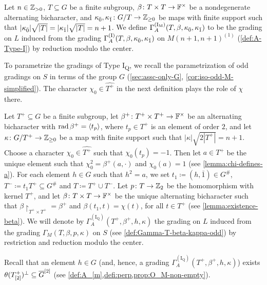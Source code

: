 \begin{defi}\label{def:Type-I_M}
    Let $n\in \mathbb{Z}_{> 0}$, $T \subseteq G$ be a finite subgroup, $\beta\colon T\times T \to \mathbb{F}^\times$ be a nondegenerate alternating bicharacter, and $\kappa_{\bar{0}}, \kappa_{\bar{1}} \colon G/T \to \mathbb{Z}_{\geq 0}$ be maps with finite support such that $|\kappa_{\bar{0}}| \sqrt{|T|} = |\kappa_{\bar{1}}| \sqrt{|T|} = n+1$. 
    We define $\Gamma^{\mathrm{(I_M)}}_A(T, \beta, \kappa_{\bar{0}}, \kappa_{\bar{1}})$ to be the grading on $L$ induced from the grading $\Gamma^{\mathrm{(I)}}_A(T, \beta, \kappa_{\bar{0}}, \kappa_{\bar{1}})$ on $M(n+1, n+1)^{(1)}$ (\cref{def:A-Type-I}) by reduction modulo the center.
\end{defi}

To parametrize the gradings of Type I\textsubscript{Q}, we recall the parametrization of odd gradings on $S$ in terms of the group $G$ (\cref{sec:assc-only-G}, \cref{cor:iso-odd-M-simplified}). 
The character $\chi_0 \in \widehat{T^+}$ in the next definition plays the role of $\chi$ there. 

\begin{defi}\label{def:Type-I_Q}
    Let $T^+ \subseteq G$ be a finite subgroup, let $\beta^+\colon T^+ \times T^+ \to \mathbb{F}^\times$ be an alternating bicharacter with $\operatorname{rad} \beta^+ = \langle t_p \rangle$, where $t_p\in T^+$ is an element of order $2$, and let $\kappa \colon G/T^+ \to \mathbb{Z}_{\geq 0}$ be a map with finite support such that $|\kappa| \sqrt{2|T^+|} = n+1$. 
    Choose a character $\chi_0 \in \widehat{T^+}$ such that $\chi_0 (t_p) = -1$. 
    Then let $a \in T^+$ be the unique element such that $\chi_0^2 = \beta^+(a, \cdot)$ and $\chi_0(a) = 1$ (see \cref{lemma:chi-defines-a}). 
    For each element $h \in G$ such that $h^2 = a$, we set $t_1 \coloneqq (h, \bar 1) \in G^\#$, $T^- \coloneqq t_1 T^+ \subseteq G^\#$ and $T \coloneqq T^+ \cup T^-$. 
    Let $p\colon T \to \mathbb{Z}_2$ be the homomorphism with kernel $T^+$, and let $\beta\colon T \times T \to \mathbb{F}^\times$ be the unique alternating bicharacter such that $\beta\restriction_{T^+ \times T^+} = \beta^+$ and $\beta(t_1, t) = \chi(t)$, for all $t\in T^+$ (see \cref{lemma:existence-beta}). 
    We will denote by  $\Gamma^{\mathrm{(I_Q)}}_A(T^+, \beta^+, h, \kappa)$ the grading on $L$ induced from the grading $\Gamma_M(T, \beta, p, \kappa)$ on $S$ (see \cref{def:Gamma-T-beta-kappa-odd}) by restriction and reduction modulo the center. 
\end{defi}

Recall that an element $h \in G$ (and, hence, a grading $\Gamma^{\mathrm{(I_Q)}}_A(T^+, \beta^+, h, \kappa)$) exists \IFF $\theta(T^+_{[2]})^\perp \subseteq \barr G^{[2]}$ (see \cref{def:A_[m],defi:perp,prop:O_M-non-empty}).

